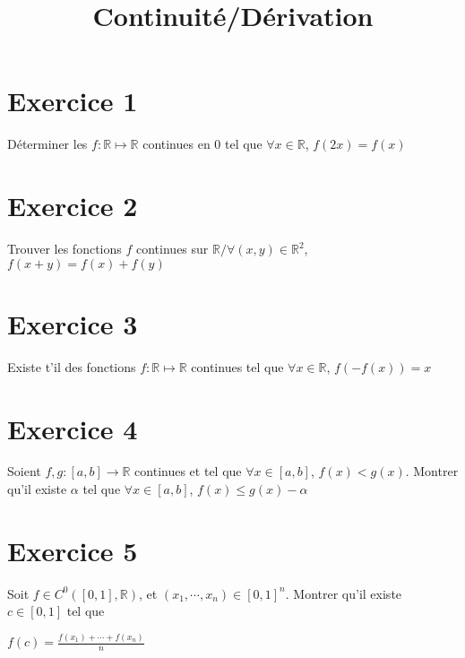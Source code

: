 \documentclass[11pt]{article}
\author{\Name \texttt{\Login}}
\date{}
\title{Continuité/Dérivation}
\begin{document}
\maketitle

\section*{Exercice 1}

Déterminer les $f:\mathbb{R} \mapsto \mathbb{R}$ continues en 0 tel que $\forall x\in \mathbb{R}$, $f(2x)=f(x)$

\section*{Exercice 2}

Trouver les fonctions $f$ continues sur $\mathbb{R}/\forall(x,y)\in\mathbb{R}^2$, $f(x+y)=f(x)+f(y)$

\section*{Exercice 3}

Existe t'il des fonctions $f:\mathbb{R}\mapsto \mathbb{R}$ continues tel que $\forall x\in\mathbb{R}$, $f(-f(x))=x$

\section*{Exercice 4}

Soient $f,g :[a,b]\to\mathbb{R}$ continues et tel que $\forall x\in [a,b]$, $f(x)<g(x)$. Montrer qu'il existe $\alpha$ tel que $\forall x\in [a,b]$, $f(x)\leq g(x)-\alpha$

\section*{Exercice 5}

Soit $f\in C^0([0,1],\mathbb{R})$, et $(x_1,\cdots,x_n)\in [0,1]^n$. Montrer qu'il existe $c\in [0,1]$ tel que

 $f(c)=\frac{f(x_1)+\cdots+f(x_n)}{n}$
\end{document}
